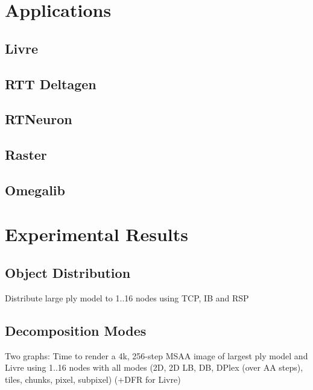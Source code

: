 \documentclass[10pt,journal,compsoc]{IEEEtran}
\begin{document}
\section{Applications}

\subsection{Livre}
\subsection{RTT Deltagen}

\subsection{RTNeuron}
\cite{HBBES:13}

\subsection{Raster}
\subsection{Omegalib}

\section{Experimental Results}
\label{SEC_results}

\subsection{Object Distribution}

Distribute large ply model to 1..16 nodes using TCP, IB and RSP

\subsection{Decomposition Modes}

Two graphs: Time to render a 4k, 256-step MSAA image of largest ply model and
Livre using 1..16 nodes with all modes (2D, 2D LB, DB, DPlex (over AA steps),
tiles, chunks, pixel, subpixel) (+DFR for Livre)
\end{document}
